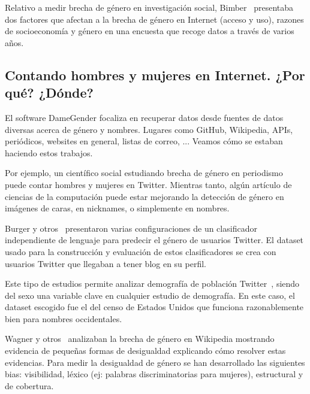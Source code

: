 \documentclass[a4paper]{article}
\begin{document}
Relativo a medir brecha de género en investigación social,
Bimber~\cite{bimber2000measuring} presentaba dos factores que afectan
a la brecha de género en Internet (acceso y uso), razones de socioeconomía
y género en una encuesta que recoge datos a través de varios años.

\subsection{Contando hombres y mujeres en Internet. ¿Por qué? ¿Dónde?}

El software DameGender focaliza en recuperar datos desde fuentes de datos
diversas acerca de género y nombres. Lugares como GitHub, Wikipedia, APIs,
periódicos, websites en general, listas de correo, ... Veamos cómo se
estaban haciendo estos trabajos.

Por ejemplo, un científico social estudiando brecha de género en
periodismo puede contar hombres y mujeres en Twitter. Mientras tanto,
algún artículo de ciencias de la computación puede estar mejorando la
detección de género en imágenes de caras, en nicknames, o simplemente
en nombres.

Burger y otros~\cite{burger2011discriminating} presentaron varias
configuraciones de un clasificador independiente de lenguaje para
predecir el género de usuarios Twitter. El dataset usado para la
construcción y evaluación de estos clasificadores se crea con usuarios
Twitter que llegaban a tener blog en su perfil.

Este tipo de estudios permite analizar demografía de población
Twitter~\cite{mislove2011understanding}, siendo del sexo una variable
clave en cualquier estudio de demografía. En este caso, el dataset
escogido fue el del censo de Estados Unidos que funciona razonablemente
bien para nombres occidentales.

Wagner y otros~\cite{wagner2015s} analizaban la brecha de género en
Wikipedia mostrando evidencia de pequeñas formas de desigualdad
explicando cómo resolver estas evidencias. Para medir la desigualdad
de género se han desarrollado las siguientes bias: visibilidad,
léxico (ej: palabras discriminatorias para mujeres), estructural y
de cobertura.
\end{document}
